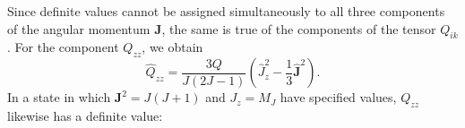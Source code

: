 Since definite values cannot be assigned simultaneously to all three components of the angular momentum $\mathbf J$, the same is true of the components of the tensor $Q_{ik}$. For the component $Q_{zz}$, we obtain
\[
 \widehat Q_{zz}=\frac{3Q}{J(2J-1)}\left(\widehat J_z^2-\frac13\widehat{\mathbf J}^{2}\right).
\]
In a state in which $\mathbf J^2=J(J+1)$ and $J_z=M_J$ have specified values, $Q_{zz}$ likewise has a definite value:
